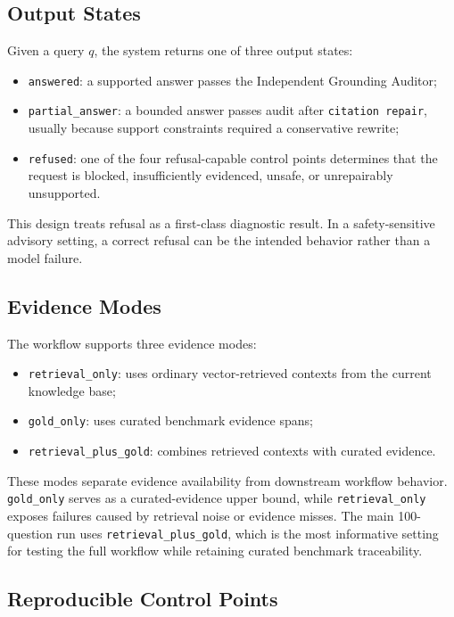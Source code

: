 \subsection{Output States}

Given a query \(q\), the system returns one of three output states:

\begin{itemize}[leftmargin=*]
  \item \texttt{answered}: a supported answer passes the Independent Grounding Auditor;
  \item \texttt{partial\_answer}: a bounded answer passes audit after \texttt{citation repair}, usually because support constraints required a conservative rewrite;
  \item \texttt{refused}: one of the four refusal-capable control points determines that the request is blocked, insufficiently evidenced, unsafe, or unrepairably unsupported.
\end{itemize}

This design treats refusal as a first-class diagnostic result. In a safety-sensitive advisory setting, a correct refusal can be the intended behavior rather than a model failure.

\subsection{Evidence Modes}

The workflow supports three evidence modes:

\begin{itemize}[leftmargin=*]
  \item \texttt{retrieval\_only}: uses ordinary vector-retrieved contexts from the current knowledge base;
  \item \texttt{gold\_only}: uses curated benchmark evidence spans;
  \item \texttt{retrieval\_plus\_gold}: combines retrieved contexts with curated evidence.
\end{itemize}

These modes separate evidence availability from downstream workflow behavior. \texttt{gold\_only} serves as a curated-evidence upper bound, while \texttt{retrieval\_only} exposes failures caused by retrieval noise or evidence misses. The main 100-question run uses \texttt{retrieval\_plus\_gold}, which is the most informative setting for testing the full workflow while retaining curated benchmark traceability.

\subsection{Reproducible Control Points}

